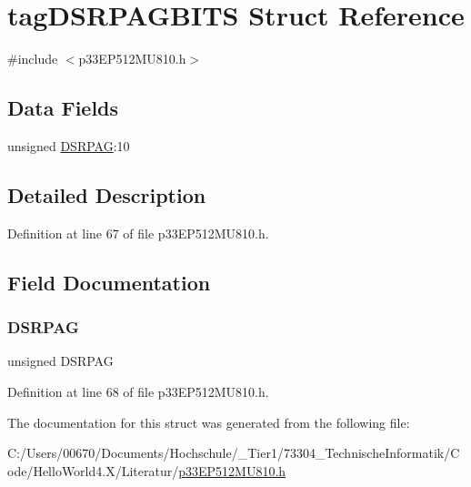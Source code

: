 \hypertarget{structtag_d_s_r_p_a_g_b_i_t_s}{}\section{tag\+D\+S\+R\+P\+A\+G\+B\+I\+TS Struct Reference}
\label{structtag_d_s_r_p_a_g_b_i_t_s}


{\ttfamily \#include $<$p33\+E\+P512\+M\+U810.\+h$>$}

\subsection*{Data Fields}
\begin{DoxyCompactItemize}
\item 
unsigned \hyperlink{structtag_d_s_r_p_a_g_b_i_t_s_aff447cf33b47980fe8688cfbbc9ad6e2}{D\+S\+R\+P\+AG}\+:10
\end{DoxyCompactItemize}


\subsection{Detailed Description}


Definition at line 67 of file p33\+E\+P512\+M\+U810.\+h.



\subsection{Field Documentation}
\mbox{\label{structtag_d_s_r_p_a_g_b_i_t_s_aff447cf33b47980fe8688cfbbc9ad6e2}} 
\subsubsection{\texorpdfstring{D\+S\+R\+P\+AG}{DSRPAG}}
{\footnotesize\ttfamily unsigned D\+S\+R\+P\+AG}



Definition at line 68 of file p33\+E\+P512\+M\+U810.\+h.



The documentation for this struct was generated from the following file\+:\begin{DoxyCompactItemize}
\item 
C\+:/\+Users/00670/\+Documents/\+Hochschule/\+\_\+\+Tier1/73304\+\_\+\+Technische\+Informatik/\+Code/\+Hello\+World4.\+X/\+Literatur/\hyperlink{p33_e_p512_m_u810_8h}{p33\+E\+P512\+M\+U810.\+h}\end{DoxyCompactItemize}
